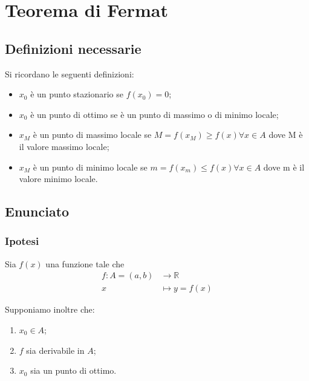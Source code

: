 \documentclass[../dimostrazioni]{subfiles}
\begin{document}
    \chapter{Teorema di Fermat}
    \label{teoFermat}

        \section*{Definizioni necessarie}

            Si ricordano le seguenti definizioni:

            \begin{itemize}
                \item \(x_0\) è un punto stazionario se \(f(x_0) = 0\);
                \item \(x_0\) è un punto di ottimo se è un punto di massimo o di minimo locale;
                \item \(x_M\) è un punto di massimo locale se  \(M = f(x_M) \geqslant f(x) \forall  x \in A\) dove M è il valore massimo locale;
                \item \(x_M\) è un punto di minimo locale se  \(m = f(x_m) \leqslant f(x) \forall  x \in A\) dove m è il valore minimo locale.
            \end{itemize}

        \section*{Enunciato}

            \subsection*{Ipotesi}

                Sia \(f(x)\) una funzione tale che
                \begin{align*}
                    f : A = (a, b) &\longrightarrow \mathbb{R}\\
                    x &\longmapsto y = f(x) 
                \end{align*}

                Supponiamo inoltre che:

            \begin{enumerate}
                \indentitem \item \(x_0 \in A\);
                \indentitem \item \(f\) sia derivabile in \(A\);
                \indentitem \item \(x_0\) sia un punto di ottimo.
            \end{enumerate}
\end{document}
